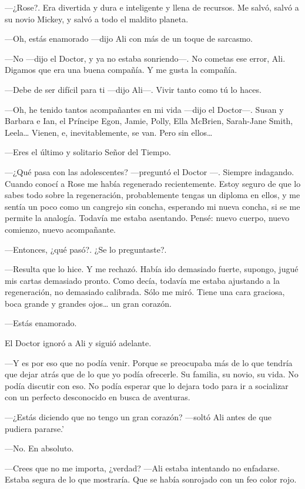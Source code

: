 ---¿Rose?. Era divertida y dura e inteligente y llena de recursos. Me
salvó, salvó a su novio Mickey, y salvó a todo el maldito planeta.

---Oh, estás enamorado ---dijo Ali con más de un toque de sarcasmo.

---No ---dijo el Doctor, y ya no estaba sonriendo---. No cometas ese
error, Ali. Digamos que era una buena compañía. Y me gusta la compañía.

---Debe de ser difícil para ti ---dijo Ali---. Vivir tanto como tú lo
haces.

---Oh, he tenido tantos acompañantes en mi vida ---dijo el Doctor---.
Susan y Barbara e Ian, el Príncipe Egon, Jamie, Polly, Ella McBrien,
Sarah-Jane Smith, Leela\ldots{} Vienen, e, inevitablemente, se van. Pero
sin ellos\ldots{}

---Eres el último y solitario Señor del Tiempo.

---¿Qué pasa con las adolescentes? ---preguntó el Doctor ---. Siempre
indagando. Cuando conocí a Rose me había regenerado recientemente. Estoy
seguro de que lo sabes todo sobre la regeneración, probablemente tengas
un diploma en ellos, y me sentía un poco como un cangrejo sin concha,
esperando mi nueva concha, si se me permite la analogía. Todavía me
estaba asentando. Pensé: nuevo cuerpo, nuevo comienzo, nuevo
acompañante.

---Entonces, ¿qué pasó?. ¿Se lo preguntaste?.

---Resulta que lo hice. Y me rechazó. Había ido demasiado fuerte,
supongo, jugué mis cartas demasiado pronto. Como decía, todavía me
estaba ajustando a la regeneración, no demasiado calibrada. Sólo me
miró. Tiene una cara graciosa, boca grande y grandes ojos\ldots{} un
gran corazón.

---Estás enamorado.

El Doctor ignoró a Ali y siguió adelante.

---Y es por eso que no podía venir. Porque se preocupaba más de lo que
tendría que dejar atrás que de lo que yo podía ofrecerle. Su familia, su
novio, su vida. No podía discutir con eso. No podía esperar que lo
dejara todo para ir a socializar con un perfecto desconocido en busca de
aventuras.

---¿Estás diciendo que no tengo un gran corazón? ---soltó Ali antes de
que pudiera pararse.'

---No. En absoluto.

---Crees que no me importa, ¿verdad? ---Ali estaba intentando no
enfadarse. Estaba segura de lo que mostraría. Que se había sonrojado con
un feo color rojo.

